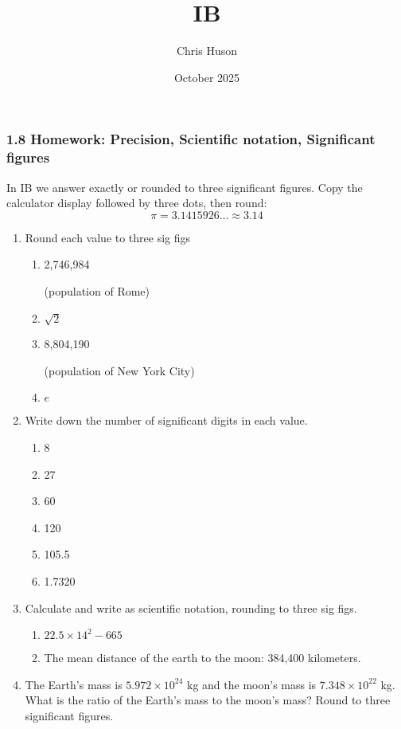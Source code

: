 \documentclass[12pt, twoside]{article}
\title{IB}
\author{Chris Huson}
\date{October 2025}
\begin{document}
\subsubsection*{1.8 Homework: Precision, Scientific notation, Significant figures}

In IB we answer exactly or rounded to three significant figures. Copy the calculator display followed by three dots, then round: $$\pi = 3.1415926\ldots \approx 3.14$$

\begin{enumerate}[itemsep=0.5cm]
\item Round each value to three sig figs
  \begin{multicols}{2}
    \begin{enumerate}[itemsep=0.5cm]
      \item 2,746,984 \par (population of Rome)
      \item $\sqrt{2}$
      \item 8,804,190 \par (population of New York City)
      \item $e$
    \end{enumerate}
  \end{multicols}

\item Write down the number of significant digits in each value.
  \begin{multicols}{3}
    \begin{enumerate}[itemsep=1cm]
      \item 8
      \item 27
      \item 60
      \item 120
      \item 105.5
      \item 1.7320
    \end{enumerate}
  \end{multicols}

\item Calculate and write as scientific notation, rounding to three sig figs.
  \begin{multicols}{2}
    \begin{enumerate}[itemsep=1cm]
      \item $22.5 \times 14^2-665$
      \item The mean distance of the earth to the moon: 384,400 kilometers.
    \end{enumerate}
  \end{multicols} \vspace{2cm}

  \item The Earth's mass is $5.972 \times 10^{24}$ kg and the moon's mass is $7.348 \times 10^{22}$ kg. What is the ratio of the Earth's mass to the moon's mass? Round to three significant figures.
       
\end{enumerate}
\end{document}
